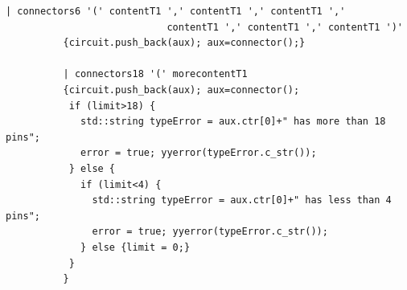 \documentclass{article}
\begin{document}
\begin{lstlisting}[basicstyle=\footnotesize]
          | connectors6 '(' contentT1 ',' contentT1 ',' contentT1 ','
                            contentT1 ',' contentT1 ',' contentT1 ')'
          {circuit.push_back(aux); aux=connector();}

          | connectors18 '(' morecontentT1
          {circuit.push_back(aux); aux=connector();
           if (limit>18) {
             std::string typeError = aux.ctr[0]+" has more than 18 pins";
             error = true; yyerror(typeError.c_str());
           } else {
             if (limit<4) {
               std::string typeError = aux.ctr[0]+" has less than 4 pins";
               error = true; yyerror(typeError.c_str());
             } else {limit = 0;}
           }
          }
\end{lstlisting}

\restoregeometry

\newpage
\end{document}
